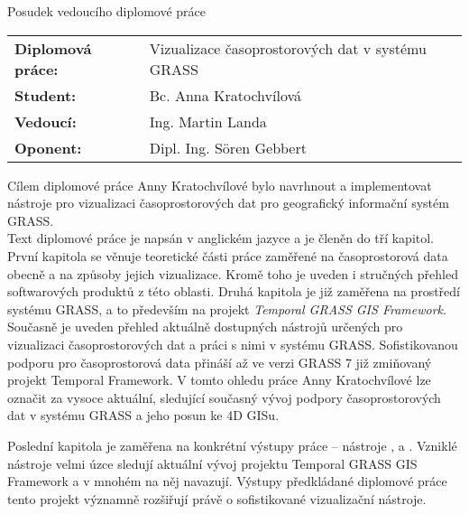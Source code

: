 \documentclass[czech,11pt,a4paper]{article}
\begin{document}
\begin{center}
  {\Large Posudek vedoucího diplomové práce}
\end{center}

\vspace{.5cm}

\noindent \begin{tabular}{lp{}}
  {\bf Diplomová práce:} &
  Vizualizace časoprostorových dat v systému GRASS \\
  {\bf Student:} & Bc. Anna Kratochvílová \\
  {\bf Vedoucí:} & Ing. Martin Landa \\
  {\bf Oponent:} & Dipl. Ing. S\"oren Gebbert \\
\end{tabular}

\vspace{1cm}

Cílem diplomové práce Anny Kratochvílové bylo navrhnout a
implementovat nástroje pro vizualizaci časoprostorových dat
pro geografický informační systém GRASS. \\

Text diplomové práce je napsán v anglickém jazyce a je členěn do tří
kapitol. První kapitola se věnuje teoretické části práce zaměřené na
časoprostorová data obecně a na způsoby jejich vizualizace. Kromě toho
je uveden i stručných přehled softwarových produktů z této
oblasti. Druhá kapitola je již zaměřena na prostředí systému GRASS, a
to především na projekt {\em Temporal GRASS GIS Framework}. Současně
je uveden přehled aktuálně dostupných nástrojů určených pro
vizualizaci časoprostorových dat a práci s nimi v systému
GRASS. Sofistikovanou podporu pro časoprostorová data přináší až ve
verzi GRASS 7 již zmiňovaný projekt Temporal Framework. V tomto ohledu
práce Anny Kratochvílové lze označit za vysoce aktuální, sledující
současný vývoj podpory časoprostorových dat v systému GRASS a jeho
posun ke 4D GISu.

Poslední kapitola je zaměřena na konkrétní výstupy práce -- nástroje
,  a . Vzniklé
nástroje velmi úzce sledují aktuální vývoj projektu Temporal GRASS GIS
Framework a v mnohém na něj navazují. Výstupy předkládané diplomové
práce tento projekt významně rozšiřují právě o
sofistikované vizualizační nástroje. \\
\end{document}
